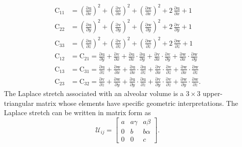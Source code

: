 \begin{subequations}
    \begin{align}	
    \mathrm{C_{11}} & = \left(\frac{\mathrm{\partial u}}{\partial x}\right)^2 + \left(\frac{\mathrm{\partial v}}{\partial x}\right)^2 + \left(\frac{\mathrm{\partial w}}{\partial x}\right)^2 + 2\, \frac{\mathrm{\partial u}}{\partial x}  + 1\\
    \mathrm{C_{22}} & = \left(\frac{\mathrm{\partial u}}{\partial y}\right)^2 + \left(\frac{\mathrm{\partial v}}{\partial y}\right)^2 + \left(\frac{\mathrm{\partial w}}{\partial y}\right)^2 + 2\, \frac{\mathrm{\partial v}}{\partial y} + 1\\
    \mathrm{C_{33}} & = \left(\frac{\mathrm{\partial u}}{\partial z}\right)^2 + \left(\frac{\mathrm{\partial v}}{\partial z}\right)^2 + \left(\frac{\mathrm{\partial w}}{\partial z}\right)^2 + 2\, \frac{\mathrm{\partial w}}{\partial z} + 1 \\
    \mathrm{C_{12}} & = \mathrm{C_{21}} = \frac{\mathrm{\partial u}}{\partial y} + \frac{\mathrm{\partial v}}{\partial x} + \frac{\mathrm{\partial u}}{\partial x} \cdot \frac{\mathrm{\partial u}}{\partial y} + \frac{\mathrm{\partial v}}{\partial x} \cdot \frac{\mathrm{\partial v}}{\partial y} + \frac{\mathrm{\partial w}}{\partial x} \cdot \frac{\mathrm{\partial w}}{\partial y}\\
    \mathrm{C_{13}} & = \mathrm{C_{31}} = \frac{\mathrm{\partial u}}{\partial z} + \frac{\mathrm{\partial w}}{\partial x} + \frac{\mathrm{\partial u}}{\partial x} \cdot \frac{\mathrm{\partial u}}{\partial z} + \frac{\mathrm{\partial v}}{\partial x} \cdot \frac{\mathrm{\partial v}}{\partial z} + \frac{\mathrm{\partial w}}{\partial x} \cdot \frac{\mathrm{\partial w}}{\partial z} \\
    \mathrm{C_{23}} & = \mathrm{C_{32}} = \frac{\mathrm{\partial v}}{\partial z} + \frac{\mathrm{\partial w}}{\partial y} + \frac{\mathrm{\partial u}}{\partial y} \cdot \frac{\mathrm{\partial u}}{\partial z} + \frac{\mathrm{\partial v}}{\partial y} \cdot \frac{\mathrm{\partial v}}{\partial z} + \frac{\mathrm{\partial w}}{\partial y} \cdot \frac{\mathrm{\partial w}}{\partial z}.
    \end{align}
\end{subequations}
The Laplace stretch associated with an alveolar volume is a $3\times3$ upper-triangular matrix whose elements have specific geometric interpretations. The Laplace stretch can be written in matrix form as \cite{FreedSrinivasa15}
\begin{equation}
    \label{LagrangianPhysicalStretch}
    \mathcal{U}_{ij} = \begin{bmatrix}
    a & a \gamma & a \beta \\
    0 & b & b \alpha \\
    0 & 0 & c \end{bmatrix} .
\end{equation}
